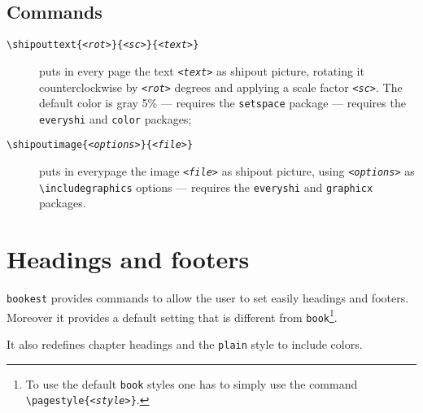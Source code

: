 \documentclass[a4paper,oneside,centered,noparindent,noparskip]{bookest}
\begin{document}
\subsection{Commands}
\begin{description}
 \item [\texttt{\textbackslash shipouttext\{\textit{<rot>}\}\{\textit{<sc>}\}\{\textit{<text>}\}}] puts in every page the text \texttt{\textit{<text>}} as shipout picture, rotating it counterclockwise by \texttt{\textit{<rot>}} degrees and applying a scale factor \texttt{\textit{<sc>}}. The default color is gray 5\% --- requires the \texttt{setspace} package --- requires the \texttt{everyshi} and \texttt{color} packages;
 \item [\texttt{\textbackslash shipoutimage\{\textit{<options>}\}\{\textit{<file>}\}}] puts in everypage the image \texttt{\textit{<file>}} as shipout picture, using \texttt{\textit{<options>}} as \texttt{\textbackslash includegraphics} options --- requires the \texttt{everyshi} and \texttt{graphicx} packages.
\end{description}

\section{Headings and footers}
\texttt{bookest} provides commands to allow the user to set easily headings and footers. Moreover it provides a default setting that is different from \texttt{book}\footnote{To use the default \texttt{book} styles one has to simply use the command \texttt{\textbackslash pagestyle\{\textit{<style>}\}}.}.

\ppar
It also redefines chapter headings and the \texttt{plain} style to include colors.
\end{document}
